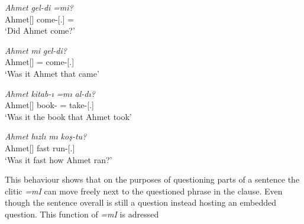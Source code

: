 \begin{exe}
    \ex \label{cliticmi}
    \begin{xlist}
        \ex \gll
        \textit{Ahmet} \textit{gel-di} \textit{=mi?} \\ Ahmet[{\Nom}] come-{\Pst}[{\Third}.{\Sg}] ={\Q} \\
        \glt `Did Ahmet come?'
        
        \ex \gll
        \textit{Ahmet} \textit{mi} \textit{gel-di?} \\ Ahmet[{\Nom}] ={\Q} come-{\Pst}[{\Third}.{\Sg}] \\
        \glt `Was it Ahmet that came'
        
        \ex \gll 
        \textit{Ahmet} \textit{kitab-ı} \textit{=mı} \textit{al-dı?} \\ Ahmet[{\Nom}] book-{\Acc} ={\Q} take-{\Pst}[{\Third}.{\Sg}] \\
        \glt `Was it the book that Ahmet took'
        
        \ex \gll 
        \textit{Ahmet} \textit{hızlı} \textit{mı} \textit{koş-tu?} \\ Ahmet[{\Nom}] fast run-{\Pst}[{\Third}.{\Sg}] \\
        \glt `Was it fast how Ahmet ran?'
    \end{xlist}
\end{exe}
This behaviour shows that on the purposes of questioning parts of a sentence the clitic \textit{=mI} can move freely next to the questioned phrase in the clause. Even though the sentence overall is still a question instead hosting an embedded question. This function of \textit{=mI} is adressed  






